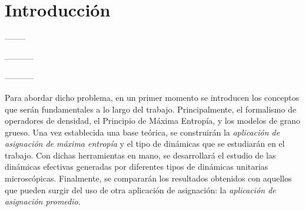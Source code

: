\chapter*{Introducción}



--------


-----------


-----------


Para abordar dicho problema, en un primer momento se introducen los conceptos que serán fundamentales a lo largo del trabajo. Principalmente, el formalismo de operadores de densidad, el Principio de Máxima Entropía, y los modelos de grano grueso. Una vez establecida una base teórica, se construirán la \textit{aplicación de asignación de máxima entropía} y el tipo de dinámicas que se estudiarán en el trabajo. Con dichas herramientas en mano, se desarrollará el estudio de las dinámicas efectivas generadas por diferentes tipos de dinámicas unitarias microscópicas. Finalmente, se compararán los resultados obtenidos con aquellos que pueden surgir del uso de otra aplicación de asignación: la \textit{aplicación de asignación promedio}.